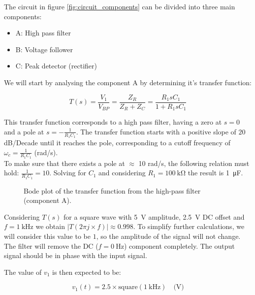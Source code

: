 \documentclass[lettersize,journal]{IEEEtran}
\begin{document}
The circuit in figure \ref{fig:circuit_components} can be divided into three main components:
\begin{itemize}
    \item A: High pass filter
    \item B: Voltage follower
    \item C: Peak detector (rectifier)
\end{itemize}

We will start by analysing the component A by determining it's transfer function:

\begin{equation}
    \label{eq:high_pass_1}
    T(s) = \frac{V_1}{V_{BP}} = \frac{Z_R}{Z_R + Z_C} = \frac{R_1sC_1}{1 + R_1sC_1}
\end{equation}

This transfer function corresponds to a high pass filter, having a zero at $s = 0$ and a pole at $s = -\frac{1}{R_1C_1}$. The transfer function starts with a positive slope of $20$ dB/Decade until it reaches the pole, corresponding to a cutoff frequency of $\omega_c = \frac{1}{R_1C_1}$ (rad/s).\\

To make sure that there exists a pole at $\approx$ 10 rad/s, the following relation must hold: $\frac{1}{R_1C_1} = 10$. Solving for $C_1$ and considering $R_1 = \SI{100}{\kilo \ohm}$ the result is \SI{1}{\micro \farad}.\\

\begin{figure}
    \centering
    \resizebox{\linewidth}{!}{
        
    }
    \caption{Bode plot of the transfer function from the high-pass filter (component A).}
    \label{graph:transfer_function_1}
\end{figure}

Considering $T(s)$ for a square wave with \SI{5}{\volt} amplitude, \SI{2.5}{\volt} DC offset and $f = \SI{1}{\kilo \hertz}$ we obtain $|T(2\pi j \times f)| \approx 0.998$. To simplify further calculations, we will consider this value to be $1$, so the amplitude of the signal will not change. The filter will remove the DC ($f = \SI{0}{\hertz}$) component completely. The output signal should be in phase with the input signal.

The value of $v_1$ is then expected to be:

\begin{equation}
    v_1(t) = 2.5 \times \text{square}(\SI{1}{\kilo \hertz}) \quad \text{(V)}
    \label{eq:signal_v1}
\end{equation}
\end{document}
